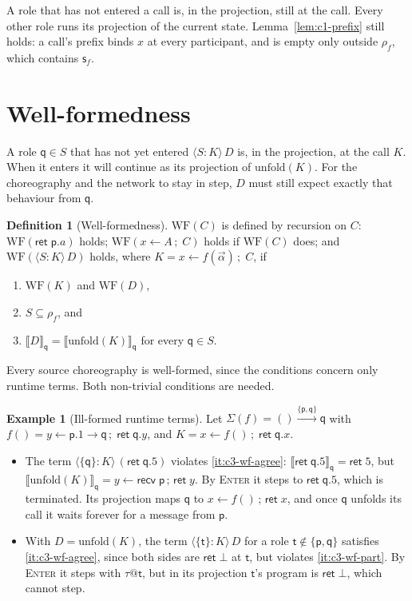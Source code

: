 \documentclass[11pt]{report}
\makeatletter
\theoremstyle{plain}
\theoremstyle{definition}
\newtheorem{definition}[theorem]{Definition}
\newtheorem{example}[theorem]{Example}
\theoremstyle{remark}
\newcommand{\kw}[1]{\mathsf{#1}}
\newcommand{\pp}{\mathsf{p}}
\newcommand{\qq}{\mathsf{q}}
\newcommand{\sr}{\mathsf{s}}
\newcommand{\tr}{\mathsf{t}}
\newcommand{\bind}[3]{#1 \leftarrow #2\,;\;#3}
\newcommand{\cret}[1]{\kw{ret}\;#1}
\newcommand{\com}[3]{#1.#2 \to #3}
\newcommand{\rt}[3]{\langle #1 : #2\rangle\,#3}
\newcommand{\unfold}[1]{\mathrm{unfold}(#1)}
\newcommand{\WF}{\mathrm{WF}}
\newcommand{\tauat}[1]{\tau\mathord{@}#1}
\newcommand{\nrecv}[1]{\kw{recv}\;#1}
\newcommand{\proj}[2]{\llbracket #1 \rrbracket_{#2}}
\newcommand{\Sig}{\Sigma}
\newcommand{\farr}[3]{(#1) \xrightarrow{#2} #3}
\newcommand{\rn}[1]{{\normalfont\scshape #1}}
\makeatother
\begin{document}
A role that has not entered a call is, in the projection, still at the call.
Every other role runs its projection of the current state.
Lemma~\ref{lem:c1-prefix} still holds: a call's prefix binds $x$ at every
participant, and is empty only outside $\rho_f$, which contains $\sr_f$.

\section{Well-formedness}
\label{sec:c3-wf}

A role $\qq\in S$ that has not yet entered $\rt{S}{K}{D}$ is, in the
projection, at the call $K$.  When it enters it will continue as its
projection of $\unfold{K}$.  For the choreography and the network to stay in
step, $D$ must still expect exactly that behaviour from $\qq$.

\begin{definition}[Well-formedness]\label{def:c3-wf}
  $\WF(C)$ is defined by recursion on $C$: $\WF(\cret{\pp.a})$ holds;
  $\WF(\bind{x}{A}{C})$ holds if $\WF(C)$ does; and
  $\WF(\rt{S}{K}{D})$ holds, where $K=\bind{x}{f(\vec\alpha)}{C}$, if
  \begin{enumerate}[label=(\roman*),nosep]
  \item\label{it:c3-wf-sub} $\WF(K)$ and $\WF(D)$,
  \item\label{it:c3-wf-part} $S\subseteq\rho_f$, and
  \item\label{it:c3-wf-agree} $\proj{D}{\qq}=\proj{\unfold{K}}{\qq}$ for every $\qq\in S$.
  \end{enumerate}
\end{definition}

Every source choreography is well-formed, since the conditions concern only
runtime terms.  Both non-trivial conditions are needed.

\begin{example}[Ill-formed runtime terms]\label{ex:c3-notwf}
  Let $\Sig(f)=\farr{}{\{\pp,\qq\}}{\qq}$ with
  $f()=\bind{y}{\com{\pp}{1}{\qq}}{\cret{\qq.y}}$, and
  $K=\bind{x}{f()}{\cret{\qq.x}}$.
  \begin{itemize}
  \item The term $\rt{\{\qq\}}{K}{(\cret{\qq.5})}$ violates
    \ref{it:c3-wf-agree}: $\proj{\cret{\qq.5}}{\qq}=\kw{ret}\;5$, but
    $\proj{\unfold{K}}{\qq}=y\leftarrow\nrecv{\pp}\,;\,\kw{ret}\;y$.  By
    \rn{Enter} it steps to $\cret{\qq.5}$, which is terminated.  Its
    projection maps $\qq$ to $x\leftarrow f()\,;\,\kw{ret}\;x$, and once $\qq$
    unfolds its call it waits forever for a message from $\pp$.
  \item With $D=\unfold{K}$, the term $\rt{\{\tr\}}{K}{D}$ for a role
    $\tr\notin\{\pp,\qq\}$ satisfies \ref{it:c3-wf-agree}, since both sides
    are $\kw{ret}\;\bot$ at $\tr$, but violates \ref{it:c3-wf-part}.  By
    \rn{Enter} it steps with $\tauat{\tr}$, but in its projection $\tr$'s
    program is $\kw{ret}\;\bot$, which cannot step.
  \end{itemize}
\end{example}
\end{document}
